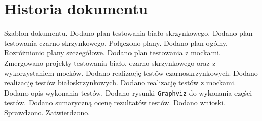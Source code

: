 \documentclass[10pt]{dokument-tiwo}
\begin{document}
\section*{Historia dokumentu}
\begin{versions}
        Szablon dokumentu.
        Dodano plan testowania biało-skrzynkowego.
        Dodano plan testowania czarno-skrzynkowego.
        Połączono plany. Dodano plan ogólny. Rozróżnionio plany
        szczegółowe.
        Dodano plan testowania z mockami.
        Zmergowano projekty testowania biało\dywiz, czarno\dywiz
        skrzynkowego oraz z wykorzystaniem mocków.
        Dodano realizację testów czarno\dywiz skrzynkowych.
        Dodano realizację testów biało\dywiz skrzynkowych.
        Dodano realizację testów z mockami.
        Dodano opis wykonania testów.
        Dodano rysunki \texttt{Graphviz} do wykonania części testów.
        Dodano sumaryczną ocenę rezultatów testów. Dodano wnioski.
        Sprawdzono. Zatwierdzono.
\end{versions}
\end{document}

